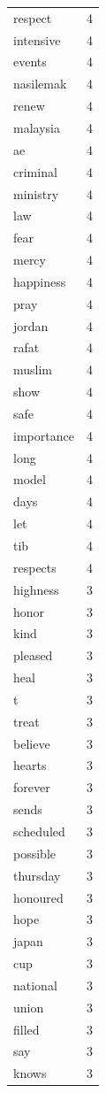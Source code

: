 \begin{tabular}{lr}
respect & 4 \\
intensive & 4 \\
events & 4 \\
nasilemak & 4 \\
renew & 4 \\
malaysia & 4 \\
ae & 4 \\
criminal & 4 \\
ministry & 4 \\
law & 4 \\
fear & 4 \\
mercy & 4 \\
happiness & 4 \\
pray & 4 \\
jordan & 4 \\
rafat & 4 \\
muslim & 4 \\
show & 4 \\
safe & 4 \\
importance & 4 \\
long & 4 \\
model & 4 \\
days & 4 \\
let & 4 \\
tib & 4 \\
respects & 4 \\
highness & 3 \\
honor & 3 \\
kind & 3 \\
pleased & 3 \\
heal & 3 \\
t & 3 \\
treat & 3 \\
believe & 3 \\
hearts & 3 \\
forever & 3 \\
sends & 3 \\
scheduled & 3 \\
possible & 3 \\
thursday & 3 \\
honoured & 3 \\
hope & 3 \\
japan & 3 \\
cup & 3 \\
national & 3 \\
union & 3 \\
filled & 3 \\
say & 3 \\
knows & 3 \\

\end{tabular}
